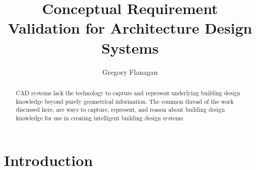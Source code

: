 \documentclass[12pt]{ucthesis}
\begin{document}

\title{Conceptual Requirement Validation for Architecture Design Systems}
\author{Gregory Flanagan}
  
 
     



\maketitle

\begin{frontmatter}

\copyrightpage

\committeemembershippage

\begin{abstract}
CAD systems lack the technology to capture and represent underlying building design
knowledge beyond purely geometrical information. The common thread of the work
 discussed here, are ways to capture, represent, and reason about building design
knowledge for use in creating intelligent building design systems.  



\end{abstract}





\tableofcontents


\listoftables

\listoffigures

\end{frontmatter}

\pagestyle{plain}




\renewcommand{\baselinestretch}{1.66}







\chapter{Introduction}
\label{intro}
\end{document}
